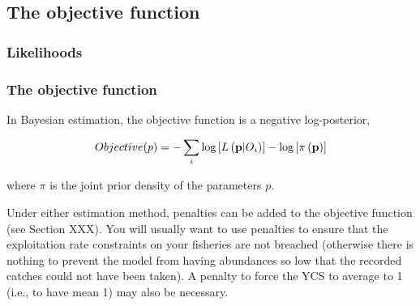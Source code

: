 \subsection{The objective function}

\subsubsection{Likelihoods}

\subsubsection{The objective function}

In Bayesian estimation, the objective function is a negative log-posterior,

\[
Objective(p)= - \sum\limits_i {\log \left[ {L\left( {{\bf{p}}|O_i } \right)} \right]}  - \log \left[ {\pi \left( {\bf{p}} \right)} \right]
\]

where $\pi$ is the joint prior density of the parameters $p$.

Under either estimation method, penalties can be added to the objective function (see Section XXX). You will usually want to use penalties to ensure that the exploitation rate constraints on your fisheries are not breached (otherwise there is nothing to prevent the model from having abundances so low that the recorded catches could not have been taken). A penalty to force the YCS to average to 1 (i.e., to have mean 1) may also be necessary.

